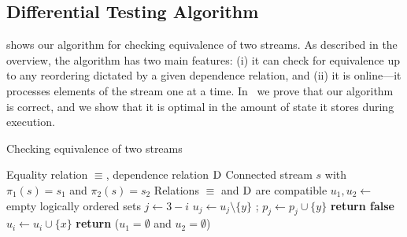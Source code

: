 \subsection{Differential Testing Algorithm}

 shows our algorithm for checking equivalence of two streams.
As described in the overview, the algorithm has two main features:
(i) it can check for equivalence up to any reordering dictated by a given dependence relation, and
(ii) it is online---it processes elements of the stream one at a time.
In~\cite{oopsla20} we prove that our algorithm is correct, and we show that it is optimal in the amount of state it stores during execution.

\begin{algorithm}[t]
  \renewcommand{\thealgorithm}{DiffStream}
  \caption{Checking equivalence of two streams}
  \label{alg:equivalence}
  \begin{algorithmic}[1]
    \Require Equality relation $\equiv$, dependence relation $\mathrel{\mathrm{D}}$
    \Require Connected stream $s$ with $\pi_1(s)=s_1$ and $\pi_2(s)=s_2$
    \renewcommand{\algorithmicrequire}{\textbf{Require:}}
    \Require Relations $\equiv$ and $\mathrel{\mathrm{D}}$ are compatible
    \label{line:StreamsEquivalentBegin}
    \State $u_1, u_2 \gets$ empty logically ordered sets
    \label{line:ProcessElementBegin}
      \State $j \gets 3-i$
      \label{line:MatchBegin}
        \State $u_j \gets u_j \setminus \{y\}$
        ;
        {\color{gray}$p_j \gets p_j \cup \{y\}$}\label{line:GhostBegin}
        \label{line:MatchEnd}
      \label{line:NotEquivalentBegin}
        \State \textbf{return false}\label{line:NotEquivalentEnd}
      \Else\label{line:UnmatchedBegin}
        \State $u_i \gets u_i \cup \{x\}$\label{line:UnmatchedEnd}
      \EndIf\label{line:ProcessElementEnd}
    \EndFor
    \State \textbf{return} ($u_1=\emptyset$ and $u_2=\emptyset$)
    \label{line:FiniteEquivalent}
    \EndFunction\label{line:StreamsEquivalentEnd}
  \end{algorithmic}
\end{algorithm}

